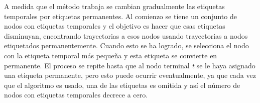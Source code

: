       A medida que el método trabaja se cambian gradualmente las etiquetas temporales por etiquetas permanentes. Al comienzo se tiene un conjunto de nodos con etiquetas temporales y el objetivo es hacer que esas etiquetas disminuyan, encontrando trayectorias a esos nodos usando trayectorias a nodos etiquetados permanentemente. Cuando esto se ha logrado, se selecciona el nodo con la etiqueta temporal más pequeña y esta etiqueta se convierte en permanente. El proceso se repite hasta que al nodo terminal \emph{t} se le haya asignado una etiqueta permanente, pero esto puede ocurrir eventualmente, ya que cada vez que el algoritmo es usado, una de las etiquetas es omitida y así el número de nodos con etiquetas temporales decrece a cero. \cite{teoria_grafos} \\
















